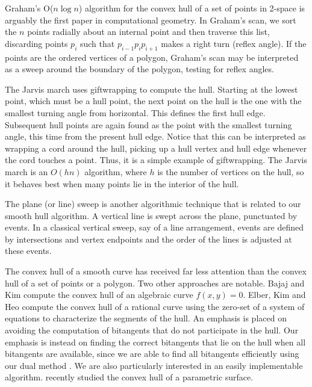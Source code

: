 \documentclass{sig-alternate}
\begin{document}
Graham's O($n \log n$) algorithm for the convex hull of a set of points in 2-space
 \cite{graham72}
is arguably the first paper in computational geometry. %
In Graham's scan, we sort the $n$ points radially about an internal point
and then traverse this list, discarding points $p_i$ such that
$p_{i-1} p_i p_{i+1}$ makes a right turn (reflex angle).
If the points are the ordered vertices of a polygon,
Graham's scan may be interpreted as a sweep around 
the boundary of the polygon, testing for reflex angles.

The Jarvis march \cite{jarvis73} uses giftwrapping to compute the hull.
Starting at the lowest point, which must be a hull point, the next point
on the hull is the one with the smallest turning angle from horizontal.
This defines the first hull edge.
Subsequent hull points are again found as the point with the smallest turning angle,
this time from the present hull edge.
Notice that this can be interpreted as wrapping a cord around the hull, picking
up a hull vertex and hull edge whenever the cord touches a point.
Thus, it is a simple example of giftwrapping.
The Jarvis march is an $O(hn)$ algorithm, where $h$ is the number of vertices on the hull,
so it behaves best when many points lie in the interior of the hull.

The plane (or line) sweep \cite{preparata85} %
is another algorithmic technique that is related to our smooth hull algorithm.
A vertical line is swept across the plane, punctuated by events.
In a classical vertical sweep, say of a line arrangement, events are
defined by intersections and vertex endpoints and the order of the lines 
is adjusted at these events.

The convex hull of a smooth curve has received far less attention
than the convex hull of a set of points or a polygon.
Two other approaches are notable.
Bajaj and Kim \cite{bajaj91} compute the convex hull of an algebraic curve $f(x,y)=0$.
Elber, Kim and Heo \cite{elber01} compute the convex hull of a rational curve
using the zero-set of a system of equations to characterize the segments of the hull.
An emphasis is placed on avoiding the computation of bitangents that do not participate
in the hull.
Our emphasis is instead on finding the correct bitangents that 
lie on the hull when all bitangents are available, since
we are able to find all bitangents efficiently using our dual method \cite{jj01}.
We are also particularly interested in an easily implementable algorithm.
\cite{seong04} recently studied the convex hull of a parametric surface.
\end{document}
